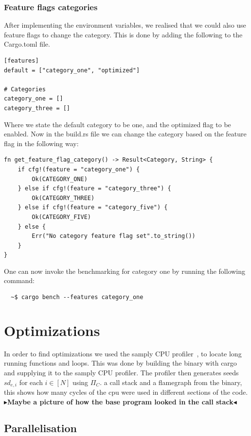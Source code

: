 \documentclass[twoside,11pt]{report}
\theoremstyle{definition}
\theoremstyle{plain}
\newcommand{\todo}[1]{{\color[rgb]{.5,0,0}\textbf{$\blacktriangleright$#1$\blacktriangleleft$}}}
\begin{document}
\subsubsection{Feature flags categories}\label{sub:feature_flags_categories}
After implementing the environment variables, we realised that we could also use feature flags to change the category. This is done by adding the following to the Cargo.toml file.
\begin{verbatim}
[features]
default = ["category_one", "optimized"]

# Categories
category_one = []
category_three = []
\end{verbatim}
Where we state the default category to be one, and the optimized flag to be enabled.
Now in the build.rs file we can change the category based on the feature flag in the following way:
\begin{verbatim}
fn get_feature_flag_category() -> Result<Category, String> {
    if cfg!(feature = "category_one") {
        Ok(CATEGORY_ONE)
    } else if cfg!(feature = "category_three") {
        Ok(CATEGORY_THREE)
    } else if cfg!(feature = "category_five") {
        Ok(CATEGORY_FIVE)
    } else {
        Err("No category feature flag set".to_string())
    }
}
\end{verbatim}
One can now invoke the benchmarking for category one by running the following command:
\begin{verbatim}
  ~$ cargo bench --features category_one
\end{verbatim}

\section{Optimizations}
In order to find optimizations we used the samply CPU profiler~\cite{Stange2024mstange}, to locate long running functions and loops. This was done by building the binary with cargo and supplying it to the samply CPU profiler. The profiler then generates seeds $sd_{e,i}$ for each $i \in [N]$ using $\Pi_C$. a call stack and a flamegraph from the binary, this shows how many cycles of the cpu were used in different sections of the code.
\todo{Maybe a picture of how the base program looked in the call stack}


\subsection{Parallelisation}\label{sub:rayon} %
\end{document}
